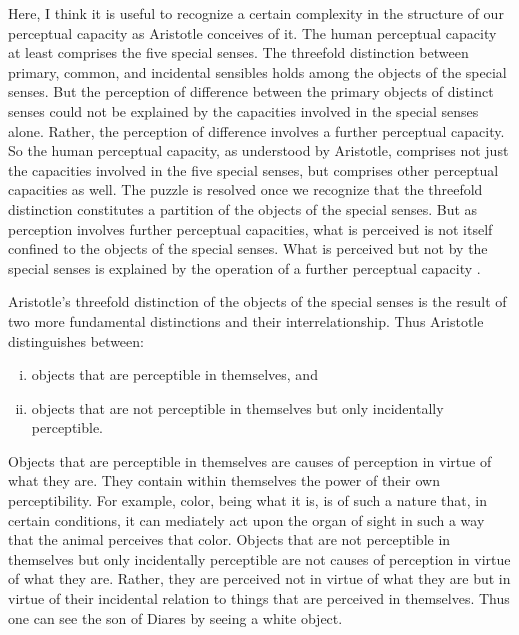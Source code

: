 Here, I think it is useful to recognize a certain complexity in the structure of our perceptual capacity as Aristotle conceives of it. The human perceptual capacity at least comprises the five special senses. The threefold distinction between primary, common, and incidental sensibles holds among the objects of the special senses. But the perception of difference between the primary objects of distinct senses could not be explained by the capacities involved in the special senses alone. Rather, the perception of difference involves a further perceptual capacity. So the human perceptual capacity, as understood by Aristotle, comprises not just the capacities involved in the five special senses, but comprises other perceptual capacities as well. The puzzle is resolved once we recognize that the threefold distinction constitutes a partition of the objects of the special senses. But as perception involves further perceptual capacities, what is perceived is not itself confined to the objects of the special senses. What is perceived but not by the special senses is explained by the operation of a further perceptual capacity \citep[see][33--34]{Gregoric:2007yq}.

Aristotle's threefold distinction of the objects of the special senses is the result of two more fundamental distinctions and their interrelationship. Thus Aristotle distinguishes between:
\begin{enumerate}[(i)]
	\item objects that are perceptible in themselves, and
	\item objects that are not perceptible in themselves but only incidentally perceptible.
\end{enumerate}

Objects that are perceptible in themselves are causes of perception in virtue of what they are. They contain within themselves the power of their own perceptibility. For example, color, being what it is, is of such a nature that, in certain conditions, it can mediately act upon the organ of sight in such a way that the animal perceives that color. Objects that are not perceptible in themselves but only incidentally perceptible are not causes of perception in virtue of what they are. Rather, they are perceived not in virtue of what they are but in virtue of their incidental relation to things that are perceived in themselves. Thus one can see the son of Diares by seeing a white object.

